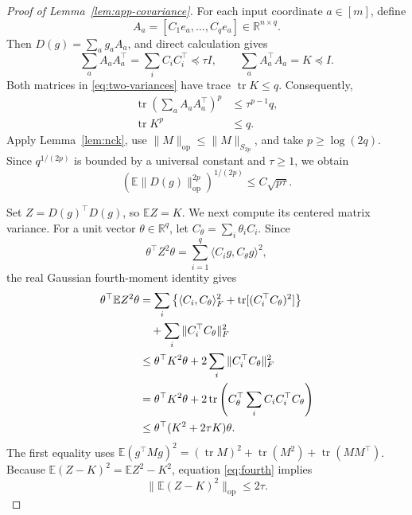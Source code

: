 \documentclass[twoside]{article}
\newcommand{\E}{\mathbb E}
\newcommand{\R}{\mathbb R}
\newcommand{\tr}{\operatorname{tr}}
\newcommand{\op}{\mathrm{op}}
\begin{document}
\begin{proof}[Proof of Lemma~\ref{lem:app-covariance}]
For each input coordinate $a\in[m]$, define
\[
 A_a=[C_1e_a,\ldots,C_qe_a]\in\R^{n\times q}.
\]
Then $D(g)=\sum_ag_aA_a$, and direct calculation gives
\begin{equation}
 \sum_aA_aA_a^\top=\sum_iC_iC_i^\top\preceq\tau I,
 \qquad
 \sum_aA_a^\top A_a=K\preceq I.
 \label{eq:two-variances}
\end{equation}
Both matrices in \eqref{eq:two-variances} have trace $\tr K\le q$.
Consequently,
\begin{align}
 \tr\left(\sum_aA_aA_a^\top\right)^p
 &\le\tau^{p-1}q,\label{eq:left-trace}\\
 \tr K^p&\le q.\label{eq:right-trace}
\end{align}
Apply Lemma~\ref{lem:nck}, use
$\|M\|_\op\le\|M\|_{S_{2p}}$, and take $p\ge\log(2q)$. Since
$q^{1/(2p)}$ is bounded by a universal constant and $\tau\ge1$, we obtain
\begin{equation}
 \left(\E\|D(g)\|_\op^{2p}\right)^{1/(2p)}
 \le C\sqrt{p\tau}.
 \label{eq:D-moment}
\end{equation}

Set $Z=D(g)^\top D(g)$, so $\E Z=K$. We next compute its centered matrix
variance. For a unit vector $\theta\in\R^q$, let
$C_\theta=\sum_i\theta_iC_i$. Since
\[
 \theta^\top Z^2\theta
 =\sum_{i=1}^q\langle C_ig,C_\theta g\rangle^2,
\]
the real Gaussian fourth-moment identity gives
\begin{align}
 \theta^\top\E Z^2\theta
 &=\sum_i\left\{
 \langle C_i,C_\theta\rangle_F^2
 +\tr[(C_i^\top C_\theta)^2]\right\}\notag\\
 &\quad+\sum_i\|C_i^\top C_\theta\|_F^2\notag\\
 &\le\theta^\top K^2\theta
 +2\sum_i\|C_i^\top C_\theta\|_F^2\notag\\
 &=\theta^\top K^2\theta
 +2\tr\left(C_\theta^\top
 \sum_iC_iC_i^\top C_\theta\right)\notag\\
 &\le\theta^\top(K^2+2\tau K)\theta.
 \label{eq:fourth}
\end{align}
The first equality uses
$\E(g^\top Mg)^2=(\tr M)^2+\tr(M^2)+\tr(MM^\top)$.
Because $\E(Z-K)^2=\E Z^2-K^2$, equation \eqref{eq:fourth} implies
\begin{equation}
 \|\E(Z-K)^2\|_\op\le2\tau.
 \label{eq:centered-variance}
\end{equation}


\end{proof}
\end{document}
